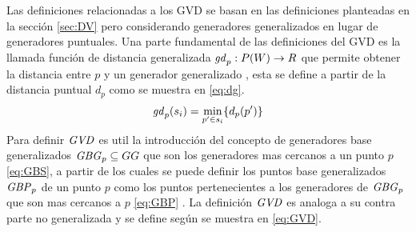 Las definiciones relacionadas a los GVD se basan en las definiciones planteadas en la sección \ref{sec:DV} pero considerando generadores generalizados en lugar de generadores puntuales. Una parte fundamental de las definiciones del GVD es la llamada función de distancia generalizada $\mathit{gd}_p : P(W) \rightarrow R$ que permite obtener la distancia entre $p$ y un generador generalizado , esta se define a partir de la distancia puntual $d_p$ como se muestra en \eqref{eq:dg}.
\begin{equation}
  \mathit{gd}_p(s_i) = \min_{p'\in s_i}\{d_p(p')\} \label{eq:dg}
\end{equation}
Para definir $\mathit{GVD}$ es util la introducción del concepto de generadores base generalizados $\mathit{GBG}_p\subseteq GG$ que son los generadores mas cercanos a un punto $p$ \eqref{eq:GBS}, a partir de los cuales se puede definir los puntos base generalizados $\mathit{GBP}_p$ de un punto $p$ como los puntos pertenecientes a los generadores de $\mathit{GBG}_p$ que son mas cercanos a $p$ \eqref{eq:GBP} . 
La definición $\mathit{GVD}$ es analoga a su contra parte no generalizada y se define según se muestra en \eqref{eq:GVD}. 




